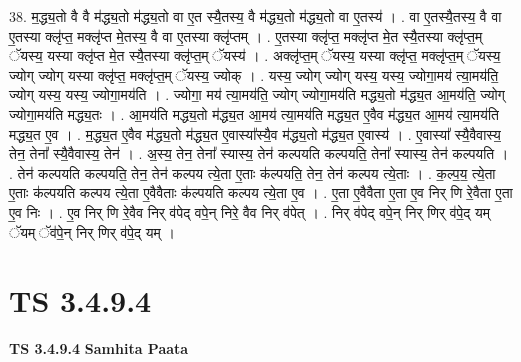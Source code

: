 \documentclass[17pt]{extarticle}
\begin{document}
38. म॒द्ध्य॒तो वै वै म॑द्ध्य॒तो म॑द्ध्य॒तो वा ए॒त स्यै॒तस्य॒ वै म॑द्ध्य॒तो म॑द्ध्य॒तो वा ए॒तस्य॑ । . वा ए॒तस्यै॒तस्य॒ वै वा ए॒तस्या क्लृ॑प्त॒ मक्लृ॑प्त मे॒तस्य॒ वै वा ए॒तस्या क्लृ॑प्तम् । . ए॒तस्या क्लृ॑प्त॒ मक्लृ॑प्त मे॒त स्यै॒तस्या क्लृ॑प्त॒म् ॅयस्य॒ यस्या क्लृ॑प्त मे॒त स्यै॒तस्या क्लृ॑प्त॒म् ॅयस्य॑ । . अक्लृ॑प्त॒म् ॅयस्य॒ यस्या क्लृ॑प्त॒ मक्लृ॑प्त॒म् ॅयस्य॒ ज्योग् ज्योग् यस्या क्लृ॑प्त॒ मक्लृ॑प्त॒म् ॅयस्य॒ ज्योक् । . यस्य॒ ज्योग् ज्योग् यस्य॒ यस्य॒ ज्योगा॒मय॑ त्या॒मय॑ति॒ ज्योग् यस्य॒ यस्य॒ ज्योगा॒मय॑ति । . ज्योगा॒ मय॑ त्या॒मय॑ति॒ ज्योग् ज्योगा॒मय॑ति मद्ध्य॒तो म॑द्ध्य॒त आ॒मय॑ति॒ ज्योग् ज्योगा॒मय॑ति मद्ध्य॒तः । . आ॒मय॑ति मद्ध्य॒तो म॑द्ध्य॒त आ॒मय॑ त्या॒मय॑ति मद्ध्य॒त ए॒वैव म॑द्ध्य॒त आ॒मय॑ त्या॒मय॑ति मद्ध्य॒त ए॒व । . म॒द्ध्य॒त ए॒वैव म॑द्ध्य॒तो म॑द्ध्य॒त ए॒वास्या᳚स्यै॒व म॑द्ध्य॒तो म॑द्ध्य॒त ए॒वास्य॑ । . ए॒वास्या᳚ स्यै॒वैवास्य॒ तेन॒ तेना᳚ स्यै॒वैवास्य॒ तेन॑ । . अ॒स्य॒ तेन॒ तेना᳚ स्यास्य॒ तेन॑ कल्पयति कल्पयति॒ तेना᳚ स्यास्य॒ तेन॑ कल्पयति । . तेन॑ कल्पयति कल्पयति॒ तेन॒ तेन॑ कल्पय त्ये॒ता ए॒ताः क॑ल्पयति॒ तेन॒ तेन॑ कल्पय त्ये॒ताः । . क॒ल्प॒य॒ त्ये॒ता ए॒ताः क॑ल्पयति कल्पय त्ये॒ता ए॒वैवैताः क॑ल्पयति कल्पय त्ये॒ता ए॒व । . ए॒ता ए॒वैवैता ए॒ता ए॒व निर् णि रे॒वैता ए॒ता ए॒व निः । . ए॒व निर् णि रे॒वैव निर् व॑पेद् वपे॒न् निरे॒ वैव निर् व॑पेत् । . निर् व॑पेद् वपे॒न् निर् णिर् व॑पे॒द् यम् ॅयम् ॅव॑पे॒न् निर् णिर् व॑पे॒द् यम् । \newline
\pagebreak
{}

\section{ TS 3.4.9.4 }

\textbf{TS 3.4.9.4 } \newline
\textbf{Samhita Paata} \newline
\end{document}
